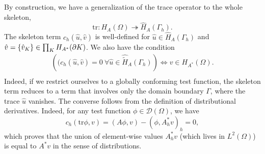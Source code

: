 By construction, we have a generalization of the trace operator to the whole skeleton,
\[
\text{tr} : H_A(\Omega) \twoheadrightarrow \widehat{H}_A(\Gamma_h).
\]
The skeleton term
$c_h(\hat{u},\hat{v})$ is well-defined for 
$\hat{u} \in \widehat{H}_A(\Gamma_h)$ and $\hat{v} = \{\hat{v}_K \} \in \prod_K H_{A^\ast}(\ptl K)$.
We also have the condition
\[
\begin{array}{c}
\left((c_h(\hat{u},\hat{v}) = 0 \: \forall \hat{u} \in \hat{\tilde{H}}_A(\Gamma_h) \right)
\Longleftrightarrow v \in H_{A^\ast}(\Omega). \\[8pt]
\end{array}
\]
Indeed, if we restrict ourselves to a globally conforming test function, the skeleton term reduces
to a term that involves only the domain boundary $\Gamma$, where the trace $\hat{u}$ vanishes. The converse follows
from the definition of distributional derivatives. 
Indeed, for any test function $\phi \in \mathcal{D}(\Omega)$,
we have
\[
c_h (\text{tr} \phi, v) = (A \phi,v) - (\phi,A^\ast_h v)_h = 0,
\]
which proves that the union of element-wise values $A^\ast_h v$ (which lives in $L^2(\Omega)$) is
equal to $A^\ast v$ in the sense of distributions.

